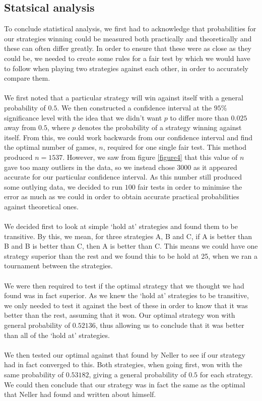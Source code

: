 \documentclass[a4paper,titlepage]{article}
\begin{document}
\subsection{Statsical analysis}
To conclude statistical analysis, we first had to acknowledge that probabilities for our strategies winning could be measured both practically and theoretically and these can often differ greatly. In order to ensure that these were as close as they could be, we needed to create some rules for a fair test by which we would have to follow when playing two strategies against each other, in order to accurately compare them.\\ \\
We first noted that a particular strategy will win against itself with a general probability of $0.5$. We then constructed a confidence interval at the $95\%$ significance level with the idea that we didn’t want $p$ to differ more than $0.025$ away from $0.5$, where $p$ denotes the probability of a strategy winning against itself. From this, we could work backwards from our confidence interval and find the optimal number of games, $n$, required for one single fair test. This method produced $n=1537$. However, we saw from figure \ref{figure4} that this value of $n$ gave too many outliers in the data, so we instead chose $3000$ as it appeared accurate for our particular confidence interval. As this number still produced some outlying data, we decided to run $100$ fair tests in order to minimise the error as much as we could in order to obtain accurate practical probabilities against theoretical ones. \\ \\
We decided first to look at simple ‘hold at’ strategies and found them to be transitive. By this, we mean, for three strategies A, B and C, if A is better than B and B is better than C, then A is better than C. This means we could have one strategy superior than the rest and we found this to be hold at 25, when we ran a tournament between the strategies.\\ \\
We were then required to test if the optimal strategy that we thought we had found was in fact superior. As we knew the ‘hold at’ strategies to be transitive, we only needed to test it against the best of these in order to know that it was better than the rest, assuming that it won. Our optimal strategy won with general probability of $0.52136$, thus allowing us to conclude that it was better than all of the ‘hold at’ strategies.\\ \\
We then tested our optimal against that found by Neller\citep{neller2004optimal} to see if our strategy had in fact converged to this. Both strategies, when going first, won with the same probability of $0.53182$, giving a general probability of $0.5$ for each strategy. We could then conclude that our strategy was in fact the same as the optimal that Neller had found and written about himself.

\nocite{*}


\end{document}
